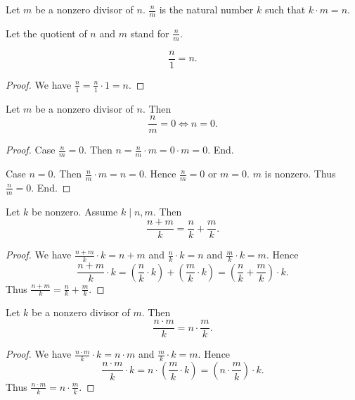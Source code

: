 \documentclass[../../arithmetic.ftl.tex]{subfiles}
\begin{document}
  \begin{forthel}
    \begin{definition}
      Let $m$ be a nonzero divisor of $n$.
      $\frac{n}{m}$ is the natural number $k$ such that $k \cdot m = n$.
    \end{definition}

    Let the quotient of $n$ and $m$ stand for $\frac{n}{m}$.

    \begin{proposition}\label{Arithmetic_03_05_479904}
      \[ \frac{n}{1} = n. \]
    \end{proposition}
    \begin{proof}
      We have $\frac{n}{1} = \frac{n}{1} \cdot 1 = n$.
    \end{proof}

    \begin{proposition}\label{Arithmetic_03_05_471851}
      Let $m$ be a nonzero divisor of $n$.
      Then \[ \frac{n}{m} = 0 \iff n = 0. \]
    \end{proposition}
    \begin{proof}
      Case $\frac{n}{m} = 0$.
        Then $n = \frac{n}{m} \cdot m = 0 \cdot m = 0$.
      End.

      Case $n = 0$.
        Then $\frac{n}{m} \cdot m = n = 0$.
        Hence $\frac{n}{m} = 0$ or $m = 0$.
        $m$ is nonzero.
        Thus $\frac{n}{m} = 0$.
      End.
    \end{proof}

    \begin{proposition}\label{Arithmetic_03_05_363442}
      Let $k$ be nonzero.
      Assume $k \mid n,m$.
      Then \[ \frac{n + m}{k} = \frac{n}{k} + \frac{m}{k}. \]
    \end{proposition}
    \begin{proof}
      We have $\frac{n + m}{k} \cdot k = n + m$ and $\frac{n}{k} \cdot k = n$ and $\frac{m}{k} \cdot k = m$.
      Hence
      \[  \frac{n + m}{k} \cdot k
          = \left( \frac{n}{k} \cdot k \right) + \left( \frac{m}{k} \cdot k \right)
          = \left( \frac{n}{k} + \frac{m}{k} \right) \cdot k. \]
      Thus $\frac{n + m}{k} = \frac{n}{k} + \frac{m}{k}$.
    \end{proof}

    \begin{proposition}\label{Arithmetic_03_05_170600}
      Let $k$ be a nonzero divisor of $m$.
      Then \[ \frac{n \cdot m}{k} = n \cdot \frac{m}{k}. \]
    \end{proposition}
    \begin{proof}
      We have $\frac{n \cdot m}{k} \cdot k = n \cdot m$ and $\frac{m}{k} \cdot k = m$.
      Hence
      \[  \frac{n \cdot m}{k} \cdot k
          = n \cdot \left( \frac{m}{k} \cdot k \right)
          = \left( n \cdot \frac{m}{k} \right) \cdot k. \]
      Thus $\frac{n \cdot m}{k} = n \cdot \frac{m}{k}$.
    \end{proof}


\end{forthel}
\end{document}

